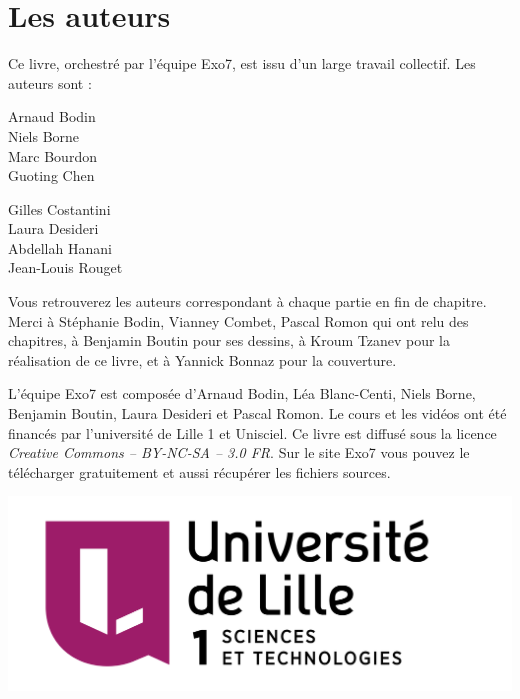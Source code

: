 
\clearemptydoublepage
\pagestyle{empty}\thispagestyle{empty}

\vspace*{\fill}

\section*{Les auteurs}

Ce livre, orchestré par l'équipe Exo7, est issu d'un large travail collectif.
Les auteurs sont :


\begin{center}
{
\setlength{\columnseprule}{0pt}
\begin{multicols}{2}
Arnaud Bodin\\
Niels Borne\\
Marc Bourdon\\
Guoting Chen

Gilles Costantini\\
Laura Desideri\\
Abdellah Hanani\\
Jean-Louis Rouget

\end{multicols}
}
\end{center}

 
Vous retrouverez les auteurs correspondant à chaque partie en fin de chapitre.
Merci à Stéphanie Bodin, Vianney Combet, Pascal Romon qui ont relu des chapitres,
à Benjamin Boutin pour ses dessins, à Kroum Tzanev pour la réalisation de ce livre, 
et à Yannick Bonnaz pour la couverture.

\medskip

L'équipe Exo7 est composée d'Arnaud Bodin, Léa Blanc-Centi, Niels Borne, 
Benjamin Boutin, Laura Desideri et Pascal Romon.
Le cours et les vidéos ont été financés par l'université de Lille 1 et Unisciel.
Ce livre est diffusé sous la licence \emph{Creative Commons -- BY-NC-SA -- 3.0 FR}.
Sur le site Exo7 vous pouvez le télécharger gratuitement et 
aussi récupérer les fichiers sources.
\vspace*{\fill}

\begin{center}
\qquad\qquad
\includegraphics[scale=0.15]{../autres/Logo-Univ-Lille-1-new.png}\qquad
{}
\end{center}

\printindex
{}

